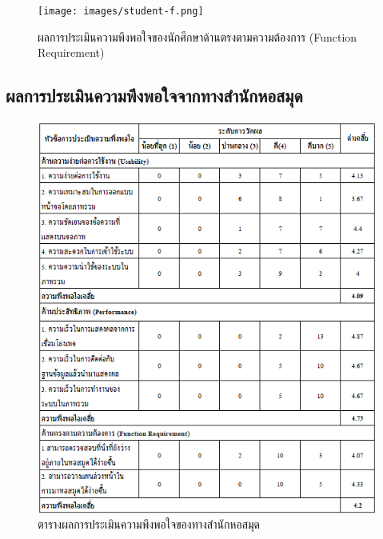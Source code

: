 \newpage
\begin{figure}[ht]
    \centering
    \texttt{[image: images/student-f.png]}
    \caption[ผลการประเมินความพึงพอใจของนักศึกษาด้านตรงตามความต้องการ (Function Requirement)]{ผลการประเมินความพึงพอใจของนักศึกษาด้านตรงตามความต้องการ (Function Requirement)}
    \label{fig:st-f}
\end{figure}

\newpage
\subsection{ผลการประเมินความพึงพอใจจากทางสำนักหอสมุด}
\begin{figure}[ht]
    \centering
    \includegraphics[width=\textwidth]{images/table-st.png}
    \caption[ตารางผลการประเมินความพึงพอใจของทางสำนักหอสมุด]{ตารางผลการประเมินความพึงพอใจของทางสำนักหอสมุด}
\label{fig:table-cmul}
\end{figure}

